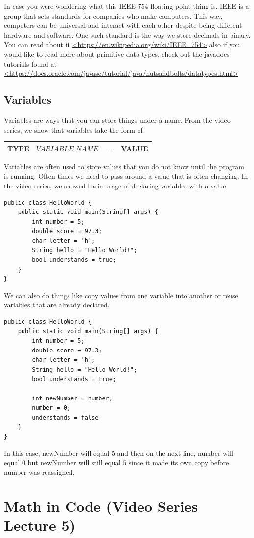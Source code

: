 \documentclass[11]{article}
\begin{document}
In case you were wondering what this IEEE 754 floating-point thing is. IEEE is  a group that sets standards for companies who make computers. This way, computers can be universal and interact with each other despite being different hardware and software. One such standard is the way we store decimals in binary. You can read about it \url{<https://en.wikipedia.org/wiki/IEEE_754>} also if you would like to read more about primitive data types, check out the javadocs tutorials found at \url{<https://docs.oracle.com/javase/tutorial/java/nutsandbolts/datatypes.html>} \\

\subsection{Variables}
Variables are ways that you can store things under a name. From the video series, we show that variables take the form of
\begin{center}
  \begin{tabular}{ | c | c | c | c |}
    \hline
    TYPE & $VARIABLE\_NAME$ & $=$ & VALUE  \\
    \hline
  \end{tabular}
\end{center}

Variables are often used to store values that you do not know until the program is running. Often times we need to pass around a value that is often changing. In the video series, we showed basic usage of declaring variables with a value.

\begin{lstlisting}
public class HelloWorld {
    public static void main(String[] args) {
        int number = 5;
        double score = 97.3;
        char letter = 'h';
        String hello = "Hello World!";
        bool understands = true;
    }
}
\end{lstlisting}

We can also do things like copy values from one variable into another or reuse variables that are already declared.

\begin{lstlisting}
public class HelloWorld {
    public static void main(String[] args) {
        int number = 5;
        double score = 97.3;
        char letter = 'h';
        String hello = "Hello World!";
        bool understands = true;
        
        int newNumber = number;
        number = 0;
        understands = false
    }
}
\end{lstlisting}
 In this case, newNumber will equal $5$ and then on the next line, number will equal $0$ but newNumber will still equal $5$ since it made its own copy before number was reassigned.

\section{Math in Code (Video Series Lecture 5)}
\end{document}

